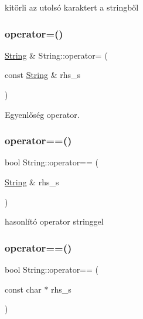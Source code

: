 kitörli az utolsó karaktert a stringből 

\mbox{\label{class_string_a803e6112834d4c0cdb0da6c6a4000e6e}} 
\subsubsection{\texorpdfstring{operator=()}{operator=()}}
{\footnotesize\ttfamily \mbox{\hyperlink{class_string}{String}} \& String\+::operator= (\begin{DoxyParamCaption}\item[{const \mbox{\hyperlink{class_string}{String}} \&}]{rhs\+\_\+s }\end{DoxyParamCaption})}



Egyenlőség operator. 

\mbox{\label{class_string_a1006dbb8a123aed87b8edb33d5cbcee4}} 
\subsubsection{\texorpdfstring{operator==()}{operator==()}\hspace{0.1cm}{\footnotesize\ttfamily [1/3]}}
{\footnotesize\ttfamily bool String\+::operator== (\begin{DoxyParamCaption}\item[{\mbox{\hyperlink{class_string}{String}} \&}]{rhs\+\_\+s }\end{DoxyParamCaption})}



hasonlító operator stringgel 

\mbox{\label{class_string_ade9af860a809548214837e33367e8835}} 
\subsubsection{\texorpdfstring{operator==()}{operator==()}\hspace{0.1cm}{\footnotesize\ttfamily [2/3]}}
{\footnotesize\ttfamily bool String\+::operator== (\begin{DoxyParamCaption}\item[{const char $\ast$}]{rhs\+\_\+s }\end{DoxyParamCaption})}



